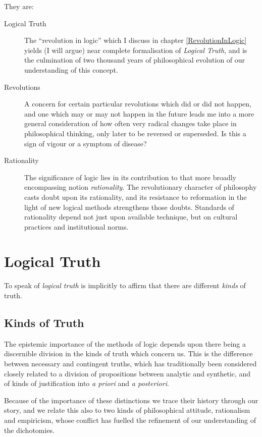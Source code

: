 They are:
\begin{description}
\item[Logical Truth]
The ``revolution in logic'' which I discuss in chapter \ref{RevolutionInLogic}
yields (I will argue) near complete formalisation of {\it Logical Truth}, and is the culmination of two thousand years of philosophical evolution of our understanding of this concept.

\item[Revolutions]
A concern for certain particular revolutions which did or did not happen, and one which may or may not happen in the future leads me into a more general consideration of how often very radical changes take place in philosophical thinking, only later to be reversed or superseded.
Is this a sign of vigour or a symptom of disease?

\item[Rationality]
The significance of logic lies in its contribution to that more broadly encompassing notion {\it rationality}.
The revolutionary character of philosophy casts doubt upon its rationality, and its resistance to reformation in the light of new logical methods strengthens those doubts.
Standards of rationality depend not just upon available technique, but on cultural practices and institutional norms.

\end{description}

\section{Logical Truth}

To speak of {\it logical truth} is implicitly to affirm that there are different {\it kinds} of truth.

\subsection{Kinds of Truth}

The epistemic importance of the methods of logic depends upon there being a discernible division in the kinds of truth which concern us.
This is the difference between necessary and contingent truths, which has traditionally been considered closely related to a division of propositions between analytic and synthetic, and of kinds of justification into {\it a priori} and {\it a posteriori}.

Because of the importance of these distinctions we trace their history through our story, and we relate this also to two kinds of philosophical attitude, rationalism and empiricism, whose conflict has fuelled the refinement of our understanding of the dichotomies.

